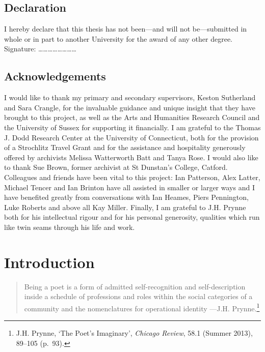 \documentclass[]{article}
\begin{document}
\subsection{Declaration}\label{declaration}

\noindent I hereby declare that this thesis has not been—and will not
be—submitted in whole or in part to another University for the award of
any other degree. \newline
\newline
\newline
\noindent Signature:
\ldots{}\ldots{}\ldots{}\ldots{}\ldots{}\ldots{}\ldots{}\ldots{}
\newpage

\subsection{Acknowledgements}\label{acknowledgements}

I would like to thank my primary and secondary supervisors, Keston
Sutherland and Sara Crangle, for the invaluable guidance and unique
insight that they have brought to this project, as well as the Arts and
Humanities Research Council and the University of Sussex for supporting
it financially. I am grateful to the Thomas J. Dodd Research Center at
the University of Connecticut, both for the provision of a Strochlitz
Travel Grant and for the assistance and hospitality generously offered
by archivists Melissa Watterworth Batt and Tanya Rose. I would also like
to thank Sue Brown, former archivist at St Dunstan’s College, Catford.
Colleagues and friends have been vital to this project: Ian Patterson,
Alex Latter, Michael Tencer and Ian Brinton have all assisted in smaller
or larger ways and I have benefited greatly from conversations with Ian
Heames, Piers Pennington, Luke Roberts and above all Kay Miller.
Finally, I am grateful to J.H. Prynne both for his intellectual rigour
and for his personal generosity, qualities which run like twin seams
through his life and work. \newpage

\section{Introduction}\label{introduction}

\begin{quote}
\singlespacing Being a poet is a form of admitted self-recognition and
self-description inside a schedule of professions and roles within the
social categories of a community and the nomenclatures for operational
identity —J.H. Prynne.\footnote{J.H. Prynne, ‘The Poet’s Imaginary’,
  \emph{Chicago Review}, 58.1 (Summer 2013), 89–105 (p.~93).}
\end{quote}
\end{document}
